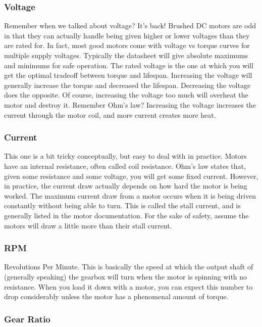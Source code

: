 \subsubsection{Voltage}

Remember when we talked about voltage? It's back! Brushed DC motors are odd in that they can actually handle being given higher or lower voltages than they are rated for. In fact, most good motors come with voltage vs torque curves for multiple supply voltages. Typically the datasheet will give absolute maximums and minimums for safe operation. The rated voltage is the one at which you will get the optimal tradeoff between torque and lifespan. Increasing the voltage will generally increase the torque and decreased the lifespan. Decreasing the voltage does the opposite. Of course, increasing the voltage too much will overheat the motor and destroy it. Remember Ohm's law? Increasing the voltage increases the current through the motor coil, and more current creates more heat.

\subsubsection{Current}

This one is a bit tricky conceptually, but easy to deal with in practice. Motors have an internal resistance, often called coil resistance. Ohm's law states that, given some resistance and some voltage, you will get some fixed current. However, in practice, the current draw actually depends on how hard the motor is being worked. The maximum current draw from a motor occurs when it is being driven constantly without being able to turn. This is called the stall current, and is generally listed in the motor documentation. For the sake of safety, assume the motors will draw a little more than their stall current.

\subsubsection{RPM}

Revolutions Per Minute. This is basically the speed at which the output shaft of (generally speaking) the gearbox will turn when the motor is spinning with no resistance. When you load it down with a motor, you can expect this number to drop considerably unless the motor has a phenomenal amount of torque.

\subsubsection{Gear Ratio}


